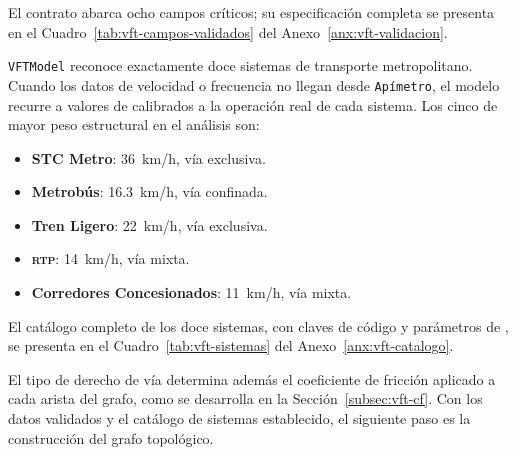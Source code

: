 El contrato abarca ocho campos críticos; su especificación completa se presenta
en el Cuadro~\ref{tab:vft-campos-validados} del Anexo~\ref{anx:vft-validacion}.

\label{subsec:vft-sistemas}

\texttt{VFTModel} reconoce exactamente doce sistemas de transporte metropolitano. Cuando
los datos de velocidad o frecuencia no llegan desde \texttt{Apímetro}, el modelo recurre
a valores de  calibrados a la operación real de cada sistema.
Los cinco de mayor peso estructural en el análisis son:

\begin{itemize}
    \item \textbf{STC Metro}: 36~km/h, vía exclusiva.
    \item \textbf{Metrobús}: 16.3~km/h, vía confinada.
    \item \textbf{Tren Ligero}: 22~km/h, vía exclusiva.
    \item \textbf{\textsc{rtp}}: 14~km/h, vía mixta.
    \item \textbf{Corredores Concesionados}: 11~km/h, vía mixta.
\end{itemize}

El catálogo completo de los doce sistemas, con claves de código y parámetros de
, se presenta en el Cuadro~\ref{tab:vft-sistemas} del
Anexo~\ref{anx:vft-catalogo}.

El tipo de derecho de vía determina además el coeficiente de fricción aplicado a
cada arista del grafo, como se desarrolla en la Sección~\ref{subsec:vft-cf}. Con
los datos validados y el catálogo de sistemas establecido, el siguiente paso es
la construcción del grafo topológico.
